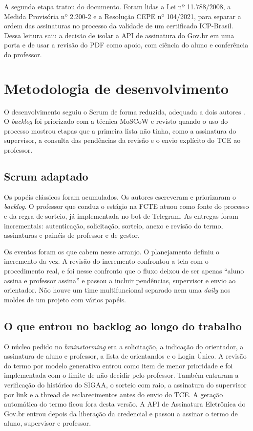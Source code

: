 A segunda etapa tratou do documento. Foram lidas a Lei nº 11.788/2008, a Medida Provisória nº 2.200-2 e a Resolução CEPE nº 104/2021, para separar a ordem das assinaturas no processo da validade de um certificado ICP-Brasil. Dessa leitura saiu a decisão de isolar a API de assinatura do Gov.br em uma porta e de usar a revisão do PDF como apoio, com ciência do aluno e conferência do professor.

\section{Metodologia de desenvolvimento}

O desenvolvimento seguiu o Scrum de forma reduzida, adequada a dois autores \cite{schwaber2020scrum}. O \textit{backlog} foi priorizado com a técnica MoSCoW \cite{clegg1994moscow} e revisto quando o uso do processo mostrou etapas que a primeira lista não tinha, como a assinatura do supervisor, a consulta das pendências da revisão e o envio explícito do TCE ao professor.

\subsection{Scrum adaptado}

Os papéis clássicos foram acumulados. Os autores escreveram e priorizaram o \textit{backlog}. O professor que conduz o estágio na FCTE atuou como fonte do processo e da regra de sorteio, já implementada no bot de Telegram. As entregas foram incrementais: autenticação, solicitação, sorteio, anexo e revisão do termo, assinaturas e painéis de professor e de gestor.

Os eventos foram os que cabem nesse arranjo. O planejamento definiu o incremento da vez. A revisão do incremento confrontou a tela com o procedimento real, e foi nesse confronto que o fluxo deixou de ser apenas ``aluno assina e professor assina'' e passou a incluir pendências, supervisor e envio ao orientador. Não houve um time multifuncional separado nem uma \textit{daily} nos moldes de um projeto com vários papéis.

\subsection{O que entrou no backlog ao longo do trabalho}

O núcleo pedido no \textit{brainstorming} era a solicitação, a indicação do orientador, a assinatura de aluno e professor, a lista de orientandos e o Login Único. A revisão do termo por modelo generativo entrou como item de menor prioridade e foi implementada com o limite de não decidir pelo professor. Também entraram a verificação do histórico do SIGAA, o sorteio com raio, a assinatura do supervisor por link e a thread de esclarecimentos antes do envio do TCE. A geração automática do termo ficou fora desta versão. A API de Assinatura Eletrônica do Gov.br entrou depois da liberação da credencial e passou a assinar o termo de aluno, supervisor e professor.


